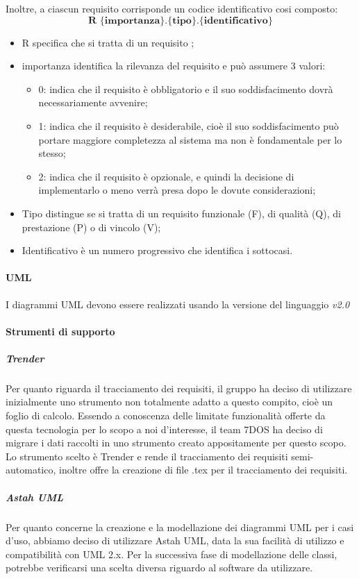 Inoltre, a ciascun requisito corrisponde un codice identificativo cosi composto:
$$ \textbf{R \{importanza\}.\{tipo\}.\{identificativo\}  } $$
\begin{itemize}
	\item R specifica che si tratta di un requisito ;
	\item importanza identifica la rilevanza del requisito e può assumere 3 valori:
	\begin{itemize}
		\item 0: indica che il requisito è obbligatorio e il suo soddisfacimento dovrà necessariamente avvenire;
		\item 1: indica che il requisito è desiderabile, cioè il suo soddisfacimento può portare maggiore completezza al sistema ma non è fondamentale per lo stesso;
		\item 2: indica che il requisito è opzionale, e quindi la decisione di implementarlo o meno verrà presa dopo le dovute considerazioni;
	\end{itemize}
	\item Tipo distingue se si tratta di un requisito funzionale (F), di qualità (Q), di prestazione (P) o di vincolo (V);
	\item Identificativo è un numero progressivo che identifica i sottocasi.
\end{itemize}
\paragraph{UML}\Spazio
I diagrammi UML devono essere realizzati usando la versione del linguaggio \emph{v2.0}
\paragraph{Strumenti di supporto}
\subparagraph{Trender}\Spazio
Per quanto riguarda il tracciamento dei requisiti, il gruppo ha deciso di utilizzare inizialmente uno strumento non totalmente adatto a questo compito, cioè un foglio di calcolo. Essendo a conoscenza delle limitate funzionalità offerte da questa tecnologia per lo scopo a noi d'interesse, il team 7DOS ha deciso di migrare i dati raccolti in uno strumento creato appositamente per questo scopo. Lo strumento scelto è Trender e rende il tracciamento dei requisiti semi-automatico, inoltre offre la creazione di file .tex per il tracciamento dei requisiti.
\subparagraph{Astah UML}\Spazio
Per quanto concerne la creazione e la modellazione dei diagrammi UML per i casi d'uso, abbiamo deciso di utilizzare Astah UML, data la sua facilità di utilizzo e compatibilità con UML 2.x. Per la successiva fase di modellazione delle classi, potrebbe verificarsi una scelta diversa riguardo al software da utilizzare.
